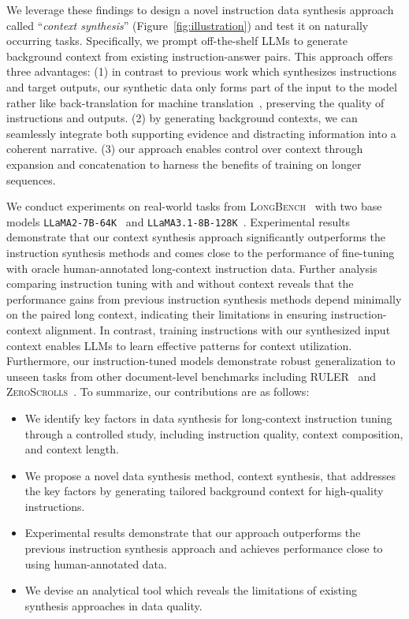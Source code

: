 We leverage these findings to design a novel instruction data synthesis approach called ``\textit{context synthesis}'' (Figure~\ref{fig:illustration}) and test it on naturally occurring tasks. 
Specifically, we prompt off-the-shelf LLMs to generate background context from existing instruction-answer pairs.
This approach offers three advantages: (1) in contrast to previous work which synthesizes instructions and target outputs, our synthetic data only forms part of the input to the model rather like back-translation for machine translation~\cite{sennrich2016improving}, preserving the quality of instructions and outputs.
(2) by generating background contexts, we can seamlessly integrate both supporting evidence and distracting information into a coherent narrative.
(3) our approach enables control over context through expansion and concatenation to harness the benefits of training on longer sequences.

We conduct experiments on real-world tasks from \textsc{LongBench}~\cite{bai2024longbench} with two base models \texttt{LLaMA2-7B-64K}~\cite{bai2024longalign} and \texttt{LLaMA3.1-8B-128K}~\cite{dubey2024llama}.
Experimental results demonstrate that our context synthesis approach significantly outperforms the instruction synthesis methods and comes close to the performance of fine-tuning with oracle human-annotated long-context instruction data.
Further analysis comparing instruction tuning with and without context reveals that the performance gains from previous instruction synthesis methods depend minimally on the paired long context, indicating their limitations in ensuring instruction-context alignment.
In contrast, training instructions with our synthesized input context enables LLMs to learn effective patterns for context utilization.
Furthermore, our instruction-tuned models demonstrate robust generalization to unseen tasks from other document-level benchmarks including \textsc{RULER}~\cite{hsieh2024ruler} and \textsc{ZeroScrolls}~\cite{shaham2023zeroscrolls}.
To summarize, our contributions are as follows: 
\begin{itemize}[itemsep=0pt, topsep=0pt, parsep=0pt]
\item We identify key factors in data synthesis for long-context instruction tuning through a controlled study, including instruction quality, context composition, and context length.
\item We propose a novel data synthesis method, context synthesis, that addresses the key factors by generating tailored background context for high-quality instructions.
\item Experimental results demonstrate that our approach outperforms the previous instruction synthesis approach and achieves performance close to using human-annotated data.
\item We devise an analytical tool which reveals the limitations of existing synthesis approaches in data quality.
\end{itemize}